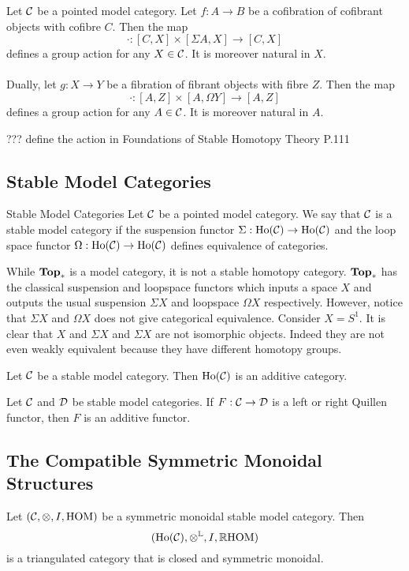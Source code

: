 \documentclass[a4paper]{article}
\begin{document}
\begin{thm}{}{} Let $\mathcal{C}$ be a pointed model category. Let $f:A\to B$ be a cofibration of cofibrant objects with cofibre $C$. Then the map $$\cdot:[C,X]\times[\Sigma A,X]\to[C,X]$$ defines a group action for any $X\in\mathcal{C}$. It is moreover natural in $X$. \\~\\

Dually, let $g:X\to Y$ be a fibration of fibrant objects with fibre $Z$. Then the map $$\cdot:[A,Z]\times[A,\Omega Y]\to[A,Z]$$ defines a group action for any $A\in\mathcal{C}$. It is moreover natural in $A$. 
\end{thm}

??? define the action in Foundations of Stable Homotopy Theory P.111

\subsection{Stable Model Categories}
\begin{defn}{Stable Model Categories}{} Let $\mathcal{C}$ be a pointed model category. We say that $\mathcal{C}$ is a stable model category if the suspension functor $\Sigma:\text{Ho}(\mathcal{C})\to\text{Ho}(\mathcal{C})$ and the loop space functor $\Omega:\text{Ho}(\mathcal{C})\to\text{Ho}(\mathcal{C})$ defines equivalence of categories. 
\end{defn}

While $\bold{Top}_\ast$ is a model category, it is not a stable homotopy category. $\bold{Top}_\ast$ has the classical suspension and loopspace functors which inputs a space $X$ and outputs the usual suspension $\Sigma X$ and loopspace $\Omega X$ respectively. However, notice that $\Sigma X$ and $\Omega X$ does not give categorical equivalence. Consider $X=S^1$. It is clear that $X$ and $\Sigma X$ and $\Sigma X$ are not isomorphic objects. Indeed they are not even weakly equivalent because they have different homotopy groups. 

\begin{thm}{}{} Let $\mathcal{C}$ be a stable model category. Then $\text{Ho}(\mathcal{C})$ is an additive category. 
\end{thm}

\begin{thm}{}{} Let $\mathcal{C}$ and $\mathcal{D}$ be stable model categories. If $F:\mathcal{C}\to\mathcal{D}$ is a left or right Quillen functor, then $F$ is an additive functor. 
\end{thm}

\subsection{The Compatible Symmetric Monoidal Structures}
\begin{thm}{}{} Let $(\mathcal{C},\otimes,I,\text{HOM})$ be a symmetric monoidal stable model category. Then $$(\text{Ho}(\mathcal{C}),\otimes^{\mathbb{L}},I,\mathbb{R}\text{HOM})$$ is a triangulated category that is closed and symmetric monoidal. 
\end{thm}
\end{document}
